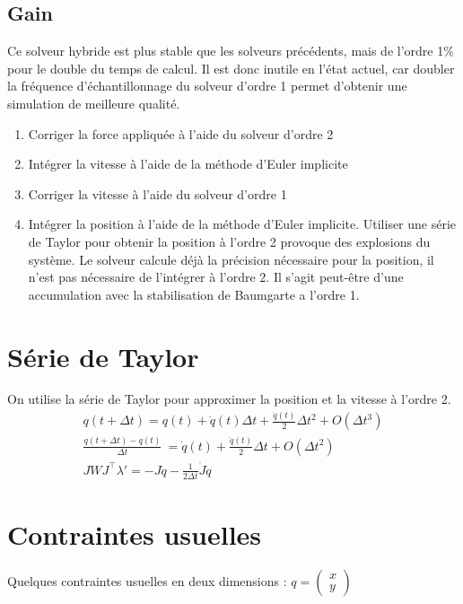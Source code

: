 \documentclass[11pt, letterpaper]{report}
\begin{document}
    \subsection{Gain}\label{subsec:problemes-rencontres-hybride}
    Ce solveur hybride est plus stable que les solveurs précédents, mais de l'ordre 1\% pour le double du temps de calcul.
    Il est donc inutile en l'état actuel, car doubler la fréquence d'échantillonnage du solveur d'ordre 1 permet d'obtenir une simulation de meilleure qualité.

    \begin{enumerate}
        \item Corriger la force appliquée à l'aide du solveur d'ordre 2
        \item Intégrer la vitesse à l'aide de la méthode d'Euler implicite
        \item Corriger la vitesse à l'aide du solveur d'ordre 1
        \item Intégrer la position à l'aide de la méthode d'Euler implicite.
        Utiliser une série de Taylor pour obtenir la position à l'ordre 2 provoque des explosions du système.
        Le solveur calcule déjà la précision nécessaire pour la position, il n'est pas nécessaire de l'intégrer à l'ordre 2.
        Il s'agit peut-être d'une accumulation avec la stabilisation de Baumgarte a l'ordre 1.
    \end{enumerate}

    \section{Série de Taylor}\label{sec:serie-taylor}
    On utilise la série de Taylor pour approximer la position et la vitesse à l'ordre 2.
    \begin{gather*}
        q(t + \Delta t) = q(t) + \dot{q}(t) \Delta t + \frac{\ddot{q}(t)}{2} \Delta t^2 + O(\Delta t^3)\\
        \frac{q(t + \Delta t) - q(t)}{\Delta t}\ = \dot{q}(t) + \frac{\ddot{q}(t)}{2} \Delta t + O(\Delta t^2)\\
        J W J^\intercal \lambda' = -J\dot{q} - \frac{1}{2 \Delta t}\dot{J}\dot{q}
    \end{gather*}



    \section{Contraintes usuelles}\label{sec:contraintes-usuelles}
    Quelques contraintes usuelles en deux dimensions :
    $q = \begin{pmatrix}
             x\\
             y
    \end{pmatrix}$
\end{document}
